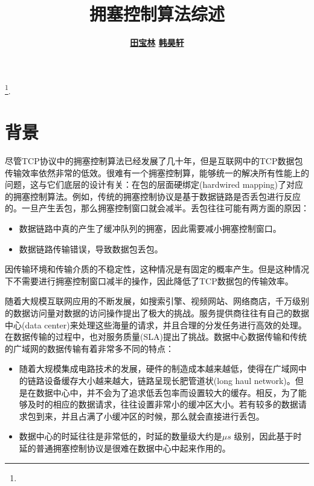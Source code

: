 \documentclass[a4paper, 12pt, UTF8]{ctexart}
\begin{document}
\title{\bf 拥塞控制算法综述} \author{
\bf \href{https://github.com/baolintian}{田宝林}\quad 
\bf \href{https://github.com/miracleXH}{韩昊轩}} 
\date{}

\maketitle
\tableofcontents
\footnote{\noindent {} \newline
  \updatetext{\today}}.

\clearpage


\section{背景}
\par 尽管TCP协议中的拥塞控制算法已经发展了几十年，但是互联网中的TCP数据包传输效率依然非常的低效。很难有一个拥塞控制算，能够统一的解决所有性能上的问题，这与它们底层的设计有关：在包的层面硬绑定(hardwired mapping)\cite{DongMZAGGS18}了对应的拥塞控制算法。例如，传统的拥塞控制协议是基于数据链路是否丢包进行反应的。一旦产生丢包，那么拥塞控制窗口就会减半。丢包往往可能有两方面的原因\cite{DBLP:conf/imc/SundaresanADC17}：
\begin{itemize}
	\item 数据链路中真的产生了缓冲队列的拥塞，因此需要减小拥塞控制窗口。
	\item 数据链路传输错误，导致数据包丢包。
\end{itemize}

\par 因传输环境和传输介质的不稳定性，这种情况是有固定的概率产生。但是这种情况下不需要进行拥塞控制窗口减半的操作，因此降低了TCP数据包的传输效率。

\par 随着大规模互联网应用的不断发展，如搜索引擎、视频网站、网络商店，千万级别的数据访问量对数据的访问操作提出了极大的挑战。服务提供商往往有自己的数据中心(data center)来处理这些海量的请求，并且合理的分发任务进行高效的处理。在数据传输的过程中，也对服务质量(SLA)提出了挑战。数据中心数据传输和传统的广域网的数据传输有着非常多不同的特点：
\begin{itemize}
	\item 随着大规模集成电路技术的发展，硬件的制造成本越来越低，使得在广域网中的链路设备缓存大小越来越大，链路呈现长肥管道状(long haul network)\cite{BDP}。但是在数据中心中，并不会为了追求低丢包率而设置较大的缓存。相反，为了能够及时的相应的数据请求，往往设置非常小的缓冲区大小。若有较多的数据请求包到来，并且占满了小缓冲区的时候，那么就会直接进行丢包。
	\item 数据中心的时延往往是非常低的，时延的数量级大约是$\mu s$ 级别，因此基于时延的普通拥塞控制协议是很难在数据中心中起来作用的\cite{DBLP:conf/sigcomm/ZakiPCSG15}。
\end{itemize}
\end{document}
